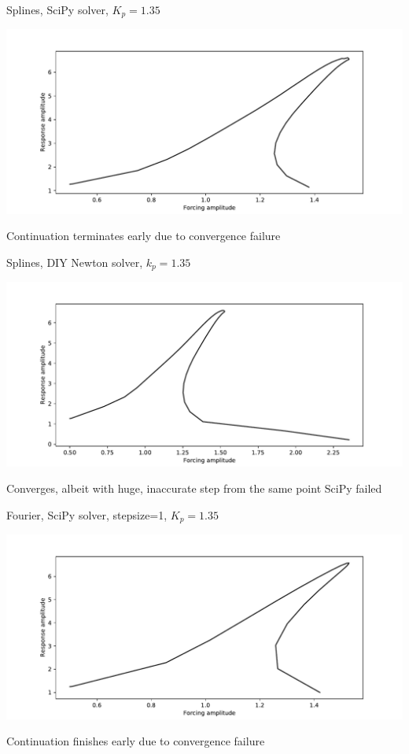 \documentclass[presentation]{beamer}
\begin{document}
\begin{frame}[label={sec:org37f9252}]{Splines, SciPy solver, \(K_p=1.35\)}
\begin{center}
\includegraphics[width=.9\linewidth]{./kp1d35_transtime100_scipy.pdf}
\end{center}

Continuation terminates early due to convergence failure
\end{frame}

\begin{frame}[label={sec:org8bfb439}]{Splines, DIY Newton solver, \(k_p=1.35\)}
\begin{center}
\includegraphics[width=.9\linewidth]{./kp1d35_transtime100_newton.pdf}
\end{center}

Converges, albeit with huge, inaccurate step from the same point SciPy failed
\end{frame}

\begin{frame}[label={sec:org8f24dec}]{Fourier, SciPy solver, stepsize=1, \(K_p=1.35\)}
\begin{center}
\includegraphics[width=.9\linewidth]{./kp1d35_transtime100_scipy_fourier.pdf}
\end{center}


Continuation finishes early due to convergence failure
\end{frame}
\end{document}
